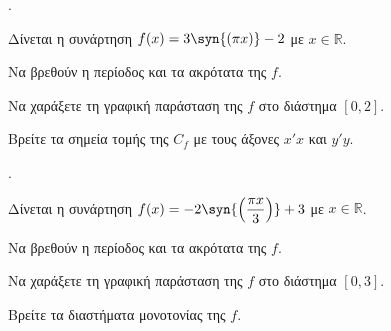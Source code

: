\documentclass[11pt,a4paper,twocolumn]{article}
\newcounter{askhsh}
\newcommand{\askhsh}{\large\theaskhsh.\ \addtocounter{askhsh}{1}}
\begin{document}
\askhsh Δίνεται η συνάρτηση $f(x)=3\syn{\left(\pi x\right)}-2$ με $x\in\mathbb{R}$.
\begin{alist}
\item Να βρεθούν η περίοδος και τα ακρότατα της $f$.
\item Να χαράξετε τη γραφική παράσταση της $f$ στο διάστημα $[0,2]$.
\item Βρείτε τα σημεία τομής της $C_f$ με τους άξονες $x'x$ και $y'y$.
\end{alist}
\askhsh Δίνεται η συνάρτηση $f(x)=-2\syn{\left(\dfrac{\pi x}{3}\right)}+3$ με $x\in\mathbb{R}$.
\begin{alist}
\item Να βρεθούν η περίοδος και τα ακρότατα της $f$.
\item Να χαράξετε τη γραφική παράσταση της $f$ στο διάστημα $[0,3]$.
\item Βρείτε τα διαστήματα μονοτονίας της $f$.
\end{alist}
\end{document}
